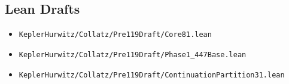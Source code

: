 \documentclass[11pt,a4paper]{article}
\theoremstyle{definition}
\theoremstyle{remark}
\begin{document}
	\subsection*{Lean Drafts}
	\begin{itemize}
		\item \texttt{KeplerHurwitz/Collatz/Pre119Draft/Core81.lean}
		\item \texttt{KeplerHurwitz/Collatz/Pre119Draft/Phase1\_447Base.lean}
		\item \texttt{KeplerHurwitz/Collatz/Pre119Draft/ContinuationPartition31.lean}
	\end{itemize}
	
\end{document}

